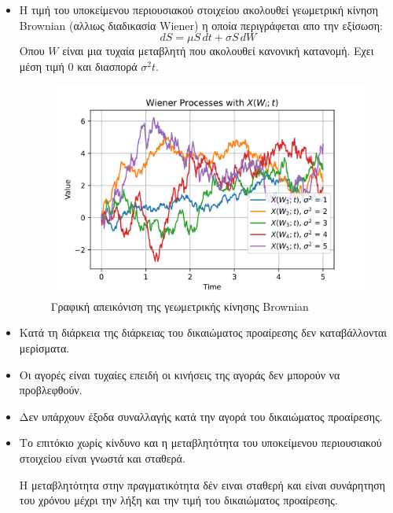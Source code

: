 \begin{itemize}
    \item Η τιμή του υποκείμενου περιουσιακού στοιχείου ακολουθεί γεωμετρική κίνηση Brownian (αλλιως διαδικασία Wiener) η οποία περιγράφεται απο την εξίσωση:
    \begin{equation}
      dS = \mu S\,dt + \sigma S\,dW
    \end{equation}
    Οπου $W$ είναι μια τυχαία μεταβλητή που ακολουθεί κανονική κατανομή.
    Εχει μέση τιμή 0 και διασπορά $\sigma^2t$.
    \begin{figure}[H]
      \centering
      \includegraphics[width=1.0\textwidth]{./figures/chapter2/wiener_process.png}
      \caption{Γραφική απεικόνιση της γεωμετρικής κίνησης Brownian}
      \label{fig:black_scholes_brownian}
    \end{figure}
    \item Κατά τη διάρκεια της διάρκειας του δικαιώματος προαίρεσης δεν καταβάλλονται μερίσματα.
    \item Οι αγορές είναι τυχαίες επειδή οι κινήσεις της αγοράς δεν μπορούν να προβλεφθούν.
    \item Δεν υπάρχουν έξοδα συναλλαγής κατά την αγορά του δικαιώματος προαίρεσης.
    \item Το επιτόκιο χωρίς κίνδυνο και η μεταβλητότητα του υποκείμενου περιουσιακού στοιχείου είναι γνωστά και σταθερά.
    \begin{tcolorbox}[colframe=blue!50!black, colback=blue!5, title=Ορισμός Προαιρεσης Μετοχών]
        Η μεταβλητότητα στην πραγματικότητα δέν ειναι σταθερή και είναι συνάρητηση του χρόνου μέχρι την λήξη και την τιμή  του δικαιώματος προαίρεσης.
        \begin{figure}[H]

\end{figure}
\end{tcolorbox}
\end{itemize}
